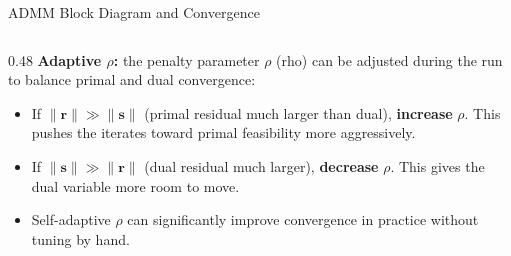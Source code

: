 \documentclass[aspectratio=169,10pt]{beamer}
\begin{document}
\begin{frame}[allowframebreaks]{ADMM Block Diagram and Convergence}
\begin{columns}
\begin{column}{0.48\textwidth}
      \medskip
      \textbf{Adaptive $\rho$:} the penalty parameter $\rho$ (rho) can be
      adjusted during the run to balance primal and dual convergence:
      \begin{itemize}
        \item If $\|\mathbf{r}\| \gg \|\mathbf{s}\|$ (primal residual much
              larger than dual), \textbf{increase} $\rho$.  This pushes
              the iterates toward primal feasibility more aggressively.
        \item If $\|\mathbf{s}\| \gg \|\mathbf{r}\|$ (dual residual much
              larger), \textbf{decrease} $\rho$.  This gives the dual
              variable more room to move.
        \item Self-adaptive $\rho$ can significantly improve convergence
              in practice without tuning by hand.
      \end{itemize}
    \end{column}
  \end{columns}

\end{frame}
\end{document}
